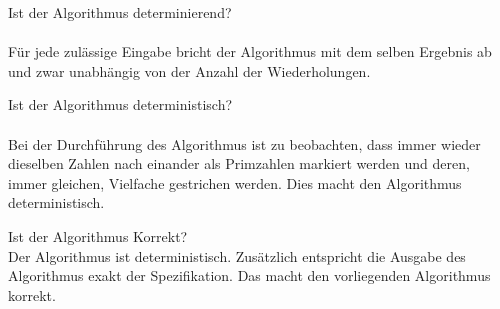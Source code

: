 \documentclass{article}
\begin{document}
	Ist der Algorithmus determinierend? \\ \\
	Für jede zulässige Eingabe bricht der Algorithmus mit dem selben Ergebnis ab und zwar unabhängig von der Anzahl der Wiederholungen.
	
	Ist der Algorithmus deterministisch? \\ \\
	Bei der Durchführung des Algorithmus ist zu beobachten, dass immer wieder dieselben Zahlen nach einander als Primzahlen markiert werden und deren, immer gleichen, Vielfache gestrichen werden. Dies macht den Algorithmus deterministisch.
	
	Ist der Algorithmus Korrekt? \\
	Der Algorithmus ist deterministisch. Zusätzlich entspricht die Ausgabe des Algorithmus exakt der Spezifikation. Das macht den vorliegenden Algorithmus korrekt.
	
\end{document}
